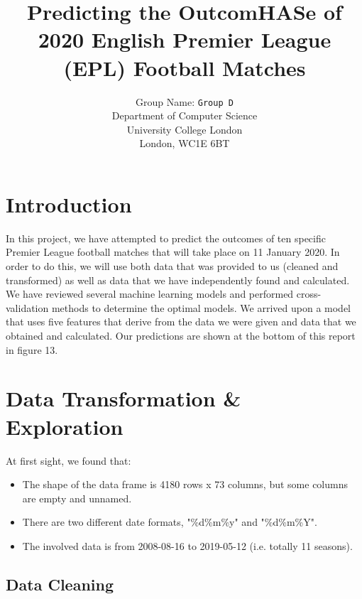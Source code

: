 \documentclass{article}
\title{Predicting the OutcomHASe of 2020 English Premier League (EPL) Football Matches}
\author{
 Group Name: \texttt{Group D}\\
  Department of Computer Science\\
  University College London\\
  London, WC1E 6BT\\
}
\begin{document}
\maketitle
{}


\section{Introduction }
In this project, we have attempted to predict the outcomes of ten specific Premier League football matches that will take place on 11 January 2020. In order to do this, we will use both data that was provided to us (cleaned and transformed) as well as data that we have independently found and calculated. We have reviewed several machine learning models and performed cross-validation methods to determine the optimal models. We arrived upon a model that uses five features that derive from the data we were given and data that we obtained and calculated. Our predictions are shown at the bottom of this report in figure 13.

\section{Data Transformation \& Exploration}

At first sight, we found that:
\begin{itemize}
\item The shape of the data frame is 4180 rows x 73 columns, but some columns are empty and unnamed.
\item There are two different date formats, "\%d\/\%m\/\%y" and "\%d\/\%m\/\%Y".
\item The involved data is from 2008-08-16 to 2019-05-12 (i.e. totally 11 seasons).
\end{itemize}


\subsection{Data Cleaning}
\end{document}
